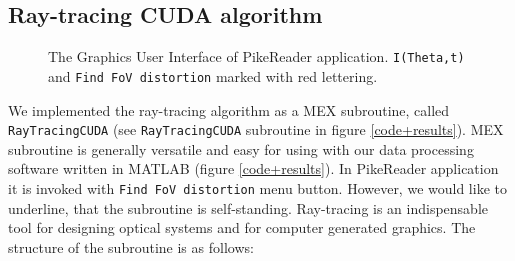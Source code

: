 \documentclass[preprint,review,12pt,dvips]{elsarticle}
\begin{document}
\subsection{Ray-tracing CUDA algorithm}
\begin{figure}[h!t!b!]
\begin{center}
\end{center}
\caption{The Graphics User Interface of PikeReader application. \texttt{I(Theta,t)} and \texttt{Find FoV distortion}
marked with red lettering.}\label{gui}
\end{figure}
We implemented the ray-tracing algorithm as a MEX subroutine, called \texttt{RayTracingCUDA} (see \texttt{RayTracingCUDA}
subroutine in figure \ref{code+results}). MEX subroutine is generally versatile and easy for using with our data
processing software written in MATLAB (figure \ref{code+results}). In PikeReader application it is invoked with
\texttt{Find FoV distortion} menu button. However, we would like to underline, that the subroutine is self-standing.
Ray-tracing is an indispensable tool for designing optical systems and for computer generated graphics. The structure of
the subroutine is as follows:
\end{document}
